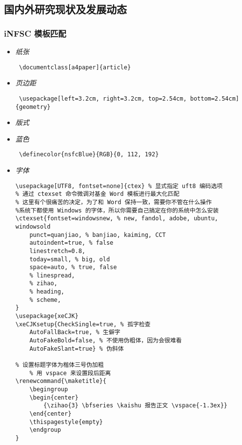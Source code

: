\documentclass[a4paper]{article}
\begin{document}
{\subsection{国内外研究现状及发展动态}

\subsubsection{iNFSC 模板匹配}
\begin{itemize}
    \item \emph{纸张}  \begin{verbatim} \documentclass[a4paper]{article} \end{verbatim}
    \item \emph{页边距 } \begin{verbatim} \usepackage[left=3.2cm, right=3.2cm, top=2.54cm, bottom=2.54cm]{geometry} \end{verbatim}
    \item \emph{版式 } 
    \item \emph{蓝色 } \begin{verbatim} \definecolor{nsfcBlue}{RGB}{0, 112, 192} \end{verbatim}
    \item \emph{字体 } \begin{verbatim}
\usepackage[UTF8, fontset=none]{ctex} % 显式指定 uft8 编码选项
% 通过 ctexset 命令微调对基金 Word 模板进行最大化匹配
% 这里有个很痛苦的决定，为了和 Word 保持一致，需要你不管在什么操作
%系统下都使用 Windows 的字体，所以你需要自己搞定在你的系统中怎么安装
\ctexset{fontset=windowsnew, % new, fandol, adobe, ubuntu, windowsold 
    punct=quanjiao, % banjiao, kaiming, CCT
    autoindent=true, % false
    linestretch=0.8,
    today=small, % big, old
    space=auto, % true, false
    % linespread,
    % zihao, 
    % heading, 
    % scheme, 
}
\usepackage{xeCJK}
\xeCJKsetup{CheckSingle=true, % 孤字检查
    AutoFallBack=true, % 生僻字
    AutoFakeBold=false, % 不使用伪粗体，因为会很难看
    AutoFakeSlant=true} % 伪斜体

% 设置标题字体为楷体三号伪加粗
    % 用 vspace 来设置段后距离
\renewcommand{\maketitle}{
    \begingroup    
    \begin{center}
        {\zihao{3} \bfseries \kaishu 报告正文 \vspace{-1.3ex}}
    \end{center}  
    \thispagestyle{empty}
    \endgroup
}


\end{verbatim}
\end{itemize}}
\end{document}
